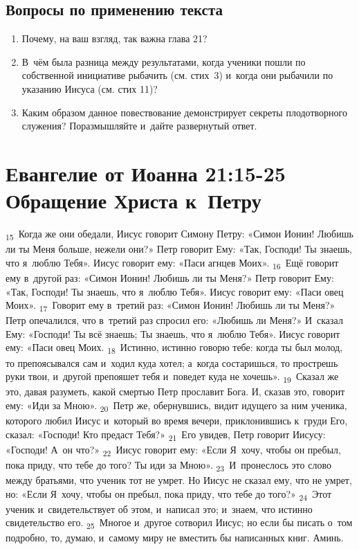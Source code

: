 \documentclass[a4paper,12pt]{article}
\begin{document}
\subsection*{Вопросы по применению текста} 
\begin{enumerate}
    \item Почему, на ваш взгляд, так важна глава 21? 
    
    \myline
    
    \myline
    \item В~чём была разница между результатами, когда ученики пошли по собственной инициативе рыбачить (см. стих~3) и~когда они рыбачили по указанию Иисуса (см. стих 11)? 
    
    \myline
    
    \myline
    \item Каким образом данное повествование демонстрирует секреты плодотворного служения? Поразмышляйте и~дайте развернутый ответ.
    
    \myline
    
    \myline
\end{enumerate}



\section{Евангелие от Иоанна 21:15-25 Обращение Христа к~Петру}

 \textsubscript{15}~Когда же они обедали, Иисус говорит Симону Петру: «Симон Ионин! Любишь ли ты Меня больше, нежели они?» Петр говорит Ему: «Так, Господи! Ты знаешь, что я~люблю Тебя». Иисус говорит ему: «Паси агнцев Моих». \textsubscript{16}~Ещё говорит ему в~другой раз: «Симон Ионин! Любишь ли ты Меня?» Петр говорит Ему: «Так, Господи! Ты знаешь, что я~люблю Тебя». Иисус говорит ему: «Паси овец Моих». \textsubscript{17}~Говорит ему в~третий раз: «Симон Ионин! Любишь ли ты Меня?» Петр опечалился, что в~третий раз спросил его: «Любишь ли Меня?» И~сказал Ему: «Господи! Ты всё знаешь; Ты знаешь, что я~люблю Тебя». Иисус говорит ему: «Паси овец Моих. \textsubscript{18}~Истинно, истинно говорю тебе: когда ты был молод, то препоясывался сам и~ходил куда хотел; а~когда состаришься, то прострешь руки твои, и~другой препояшет тебя и~поведет куда не хочешь». \textsubscript{19}~Сказал же это, давая разуметь, какой смертью Петр прославит Бога. И, сказав это, говорит ему: «Иди за Мною». \textsubscript{20}~Петр же, обернувшись, видит идущего за ним ученика, которого любил Иисус и~который во время вечери, приклонившись к~груди Его, сказал: «Господи! Кто предаст Тебя?» \textsubscript{21}~Его увидев, Петр говорит Иисусу: «Господи! А~он что?» \textsubscript{22}~Иисус говорит ему: «Если Я~хочу, чтобы он пребыл, пока приду, что тебе до того? Ты иди за Мною». \textsubscript{23}~И~пронеслось это слово между братьями, что ученик тот не умрет. Но Иисус не сказал ему, что не умрет, но: «Если Я~хочу, чтобы он пребыл, пока приду, что тебе до того?» \textsubscript{24}~Этот ученик и~свидетельствует об этом, и~написал это; и~знаем, что истинно свидетельство его. \textsubscript{25}~Многое и~другое сотворил Иисус; но если бы писать о~том подробно, то, думаю, и~самому миру не вместить бы написанных книг. Аминь. 
\end{document}
